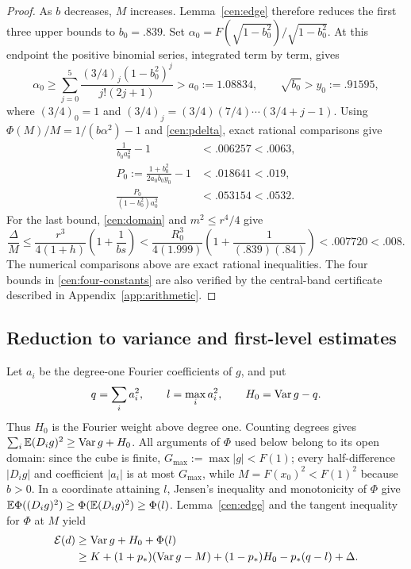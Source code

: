 \begin{proof}
As $b$ decreases, $M$ increases.  Lemma~\ref{cen:edge} therefore reduces
the first three upper bounds to $b_0=.839$.  Set
$\alpha_0=F(\sqrt{1-b_0^2})/\sqrt{1-b_0^2}$.
At this endpoint the positive binomial series, integrated term by term,
gives
\[
 \alpha_0\ge\sum_{j=0}^{5}
 \frac{(3/4)_j(1-b_0^2)^j}{j!(2j+1)}>a_0:=1.08834,
 \qquad \sqrt{b_0}>y_0:=.91595,
\]
where $(3/4)_0=1$ and $(3/4)_j=(3/4)(7/4)\cdots(3/4+j-1)$.
Using $\Phi(M)/M=1/(b\alpha^2)-1$ and \eqref{cen:pdelta}, exact rational
comparisons give
\begin{align*}
 \frac1{b_0a_0^2}-1&<.006257<.0063,\\
 P_0:=\frac{1+b_0^2}{2a_0b_0y_0}-1&<.018641<.019,\\
 \frac{P_0}{(1-b_0^2)a_0^2}&<.053154<.0532.
\end{align*}
For the last bound, \eqref{cen:domain} and $m^2\le r^4/4$ give
\[
 \frac\Delta M\le
 \frac{r^3}{4(1+h)}\left(1+\frac1{bs}\right)
 <\frac{R_0^3}{4(1.999)}
       \left(1+\frac1{(.839)(.84)}\right)<.007720<.008.
\]
The numerical comparisons above are exact rational inequalities.
The four bounds in \eqref{cen:four-constants} are also verified by the
central-band certificate described in Appendix~\ref{app:arithmetic}.
\end{proof}

\subsection{Reduction to variance and first-level estimates}

Let $a_i$ be
the degree-one Fourier coefficients of $g$, and put
\[
 q=\sum_i a_i^2,\qquad l=\max_i a_i^2,\qquad H_0=\operatorname{Var} g-q.
\]
Thus $H_0$ is the Fourier weight above degree one.  Counting degrees gives
$\sum_i\mathbb E(D_i g)^2\ge\operatorname{Var} g+H_0$.
All arguments of $\Phi$ used below belong to its open domain:
since the cube is finite, $G_{\max}:=\max|g|<F(1)$; every half-difference
$|D_i g|$ and coefficient $|a_i|$ is at most $G_{\max}$, while
$M=F(x_0)^2<F(1)^2$ because $b>0$.
In a coordinate attaining $l$, Jensen's inequality and monotonicity of
$\Phi$ give
$\mathbb E\Phi((D_i g)^2)\ge\Phi(\mathbb E(D_i g)^2)\ge\Phi(l)$.
Lemma~\ref{cen:edge} and the tangent inequality for $\Phi$ at $M$ yield
\begin{align}
 \mathcal E(d)&\ge\operatorname{Var} g+H_0+\Phi(l)\label{cen:spectral-energy}\\
 &\ge K+(1+p_*)(\operatorname{Var} g-M)+(1-p_*)H_0
             -p_*(q-l)+\Delta.\label{cen:tangent-energy}
\end{align}


